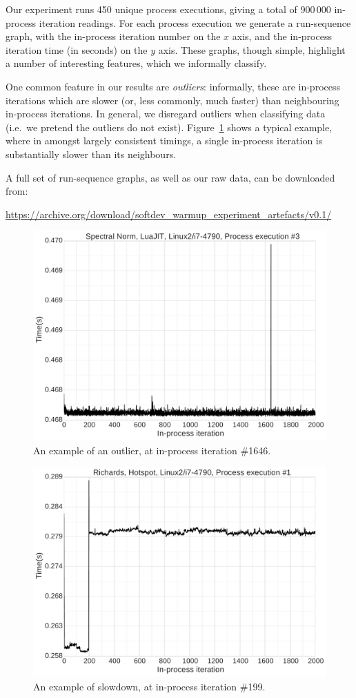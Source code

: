 \documentclass[preprint,numbers,10pt]{sigplanconf}
\begin{document}

Our experiment runs 450 unique process executions, giving a total of 900\,000
in-process iteration readings. For each process execution we generate a
run-sequence graph, with the in-process iteration number on the $x$ axis, and the
in-process iteration time (in seconds) on the $y$ axis.
These graphs, though simple, highlight a number of
interesting features, which we informally classify.

One common feature in our results are \emph{outliers}: informally, these are
in-process iterations which are slower (or, less commonly, much
faster) than neighbouring in-process iterations. In general, we disregard outliers
when classifying data (i.e.~we pretend the outliers do not exist). Figure~\ref{fig:examples:outliers1}
shows a typical
example, where in amongst largely consistent timings, a single in-process
iteration is substantially slower than its neighbours.

A full set of run-sequence graphs, as well as our raw data, can be downloaded from:
\vspace{-.5em}
\begin{center}
{\small%
\url{https://archive.org/download/softdev_warmup_experiment_artefacts/v0.1/}
}
\end{center}

\begin{figure}[tbp]
\includegraphics[width=.475\textwidth]{examples/outliers1}
\caption{An example of an outlier, at in-process iteration \#1646.}
\label{fig:examples:outliers1}
\end{figure}

\begin{figure}[tbp]
\includegraphics[width=.475\textwidth]{examples/slowdown1}
\caption{An example of slowdown, at in-process iteration \#199.}
\label{fig:examples:slowdown1}
\end{figure}
\end{document}

